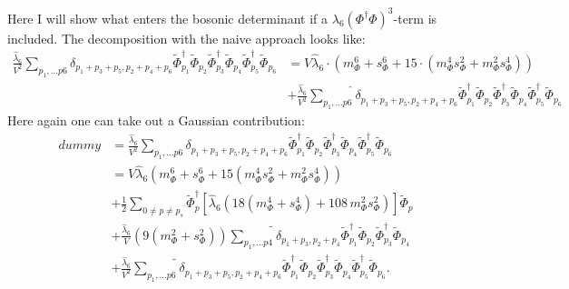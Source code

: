 Here I will show what enters the bosonic determinant if a $\lambda_6 (\Phi^{\dagger}\Phi)^3$-term is included.
The decomposition with the naive approach looks like:
\begin{align}\label{eq:naive_decomposition_of_phi6_term}
 \frac{\hat\lambda_6}{V^2}\sum\limits_{p_1,\dots p6} \delta_{p_1 + p_3 + p_5, p_2 + p_4 + p_6} 
                     \tilde\Phi_{p_1}^{\dagger} \tilde\Phi_{p_2} \tilde\Phi_{p_3}^{\dagger} \tilde\Phi_{p_4} \tilde\Phi_{p_5}^{\dagger} \tilde\Phi_{p_6}
      &=  V \hat\lambda_6 \cdot \left( m_{\Phi}^6 + s_{\Phi}^6 + 15\cdot\left(m_{\Phi}^4 s_{\Phi}^2 + m_{\Phi}^2 s_{\Phi}^4 \right) \right) 
    \nonumber \\
      & + \frac{\hat\lambda_6}{V^2}\widehat{\sum\limits_{p_1,\dots p6}} \delta_{p_1 + p_3 + p_5, p_2 + p_4 + p_6} 
                     \tilde\Phi_{p_1}^{\dagger} \tilde\Phi_{p_2} \tilde\Phi_{p_3}^{\dagger} \tilde\Phi_{p_4} \tilde\Phi_{p_5}^{\dagger} \tilde\Phi_{p_6}
\end{align}
Here again one can take out a Gaussian contribution:
\begin{align}\label{eq:alternative_decomposition_of_phi6_term}
 dummy&=\frac{\hat\lambda_6}{V^2}\sum\limits_{p_1,\dots p6} \delta_{p_1 + p_3 + p_5, p_2 + p_4 + p_6} 
                     \tilde\Phi_{p_1}^{\dagger} \tilde\Phi_{p_2} \tilde\Phi_{p_3}^{\dagger} \tilde\Phi_{p_4} \tilde\Phi_{p_5}^{\dagger} \tilde\Phi_{p_6}
    \nonumber \\
      &=  V \hat\lambda_6 \left( m_{\Phi}^6 + s_{\Phi}^6 + 15\left(m_{\Phi}^4 s_{\Phi}^2 + m_{\Phi}^2 s_{\Phi}^4 \right) \right) 
    \nonumber \\
      & +  \frac{1}{2} \sum\limits_{0\neq p\neq p_s} \tilde\Phi_p^{\dagger} \left[ \hat\lambda_6\left( 18 \left( m_{\Phi}^4 + s_{\Phi}^4 \right) 
                       + 108\,  m_{\Phi}^2 s_{\Phi}^2\right)
                       \right]   \tilde\Phi_p
    \nonumber \\
      & + \frac{\hat\lambda_6}{V} \left( 9\left( m_{\Phi}^2 + s_{\Phi}^2 \right) \right)\widetilde{\sum\limits_{p_1,\dots p4}} \delta_{p_1 + p_3, p_2 + p_4 } 
                     \tilde\Phi_{p_1}^{\dagger} \tilde\Phi_{p_2} \tilde\Phi_{p_3}^{\dagger} \tilde\Phi_{p_4}
    \nonumber \\
      & + \frac{\hat\lambda_6}{V^2}\widetilde{\sum\limits_{p_1,\dots p6}} \delta_{p_1 + p_3 + p_5, p_2 + p_4 + p_6}
                     \tilde\Phi_{p_1}^{\dagger} \tilde\Phi_{p_2} \tilde\Phi_{p_3}^{\dagger} \tilde\Phi_{p_4} \tilde\Phi_{p_5}^{\dagger} \tilde\Phi_{p_6}.
\end{align}
